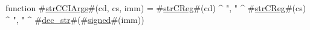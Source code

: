 function #\hyperref[sailMIPSzstrCCIArgs]{strCCIArgs}#(cd, cs, imm) = #\hyperref[sailMIPSzstrCReg]{strCReg}#(cd) ^ ", " ^ #\hyperref[sailMIPSzstrCReg]{strCReg}#(cs) ^ ", " ^ #\hyperref[sailMIPSzdeczystr]{dec\_str}#(#\hyperref[sailMIPSzsigned]{signed}#(imm))
